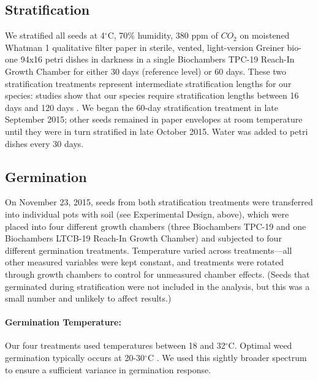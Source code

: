 \documentclass[11pt]{article}\usepackage[]{graphicx}\usepackage[]{color}
\begin{document}
	\subsection{Stratification} 
	We stratified all seeds at 4$^\circ$C, 70\% humidity, 380 ppm of $CO_2$ \parencite[e.g.,][]{Meekins1999,Popay1970} on moistened Whatman 1 qualitative filter paper in sterile, vented, light-version Greiner bio-one 94x16 petri dishes in darkness \parencite{Baskin1998,Popay1970} in a single Biochambers TPC-19 Reach-In Growth Chamber for either 30 days (reference level) or 60 days. These two stratification treatments represent intermediate stratification lengths for our species: studies show that our species require stratification lengths between 16 days \parencite{Popay1970} and 120 days \parencite{Meekins1999}. We began the 60-day stratification treatment in late September 2015; other seeds remained in paper envelopes at room temperature until they were in turn stratified in late October 2015.  Water was added to petri dishes every 30 days.
	
	\subsection{Germination}
	On November 23, 2015, seeds from both stratification treatments were transferred into individual pots with soil (see Experimental Design, above), which were placed into four different growth chambers (three Biochambers TPC-19 and one Biochambers LTCB-19 Reach-In Growth Chamber) and subjected to four different germination treatments. Temperature varied across treatments---all other measured variables were kept constant, and treatments were rotated through growth chambers to control for unmeasured chamber effects. (Seeds that germinated during stratification were not included in the analysis, but this was a small number and unlikely to affect results.)
	
	\paragraph{Germination Temperature:} Our four treatments used temperatures between 18 and 32$^\circ$C. Optimal weed germination typically occurs at 20-30$^\circ$C \parencite{Hartmann2010,Steinbauer1957,Wulff1994,Popay1970}. We used this  sightly broader spectrum to ensure a sufficient variance in germination response.
	
\end{document}
